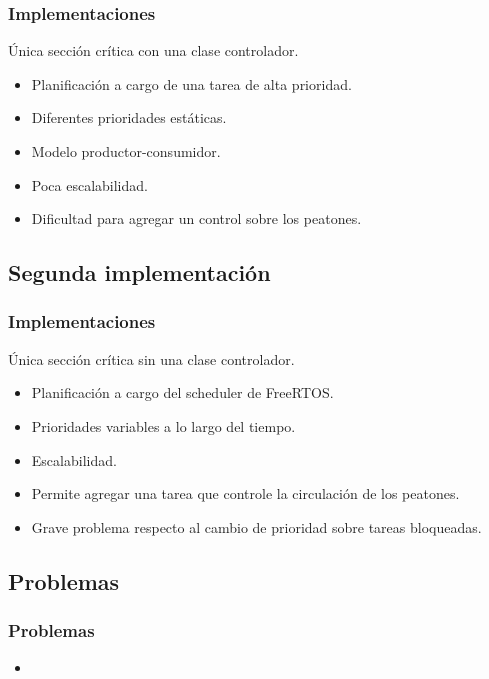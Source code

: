 \begin{frame}
\frametitle{Implementaciones}
\begin{block}{Única sección crítica con una clase controlador.}
	\begin{itemize}
		\item Planificación a cargo de una tarea de alta prioridad.
		\item Diferentes prioridades estáticas.
		\item Modelo productor-consumidor.
		\item Poca escalabilidad.
		\item Dificultad para agregar un control sobre los peatones.
	\end{itemize}
\end{block}
\end{frame}

\subsection{Segunda implementación}
\begin{frame}
\frametitle{Implementaciones}
\begin{block}{Única sección crítica sin una clase controlador.}
	\begin{itemize}
		\item Planificación a cargo del scheduler de FreeRTOS.
		\item Prioridades variables a lo largo del tiempo.
		\item Escalabilidad.
		\item Permite agregar una tarea que controle la circulación de los peatones.
		\item Grave problema respecto al cambio de prioridad sobre tareas bloqueadas.
	\end{itemize}
\end{block}
\end{frame}

\subsection{Problemas}
\begin{frame}
\frametitle{Problemas}
\begin{block}{}
	\begin{itemize}
		\item
	\end{itemize}
\end{block}
\end{frame}

